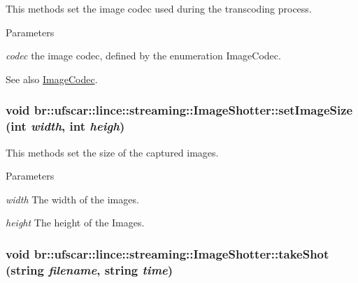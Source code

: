 This methods set the image codec used during the transcoding process. 


\begin{DoxyParams}{Parameters}
\item[{\em codec}]the image codec, defined by the enumeration ImageCodec. \end{DoxyParams}
\begin{DoxySeeAlso}{See also}
\hyperlink{namespacebr_1_1ufscar_1_1lince_1_1streaming_aeaf227c1caf3369cc7c90188dac89494}{ImageCodec}. 
\end{DoxySeeAlso}
\hypertarget{classbr_1_1ufscar_1_1lince_1_1streaming_1_1ImageShotter_a0e98451cd6314d1649499d7f0b607530}{
\subsubsection[{setImageSize}]{\setlength{\rightskip}{0pt plus 5cm}void br::ufscar::lince::streaming::ImageShotter::setImageSize (int {\em width}, \/  int {\em heigh})}}
\label{classbr_1_1ufscar_1_1lince_1_1streaming_1_1ImageShotter_a0e98451cd6314d1649499d7f0b607530}


This methods set the size of the captured images. 


\begin{DoxyParams}{Parameters}
\item[{\em width}]The width of the images. \item[{\em height}]The height of the Images. \end{DoxyParams}
\hypertarget{classbr_1_1ufscar_1_1lince_1_1streaming_1_1ImageShotter_a793acdf0bc839712847085535780a900}{
\subsubsection[{takeShot}]{\setlength{\rightskip}{0pt plus 5cm}void br::ufscar::lince::streaming::ImageShotter::takeShot (string {\em filename}, \/  string {\em time})}}
\label{classbr_1_1ufscar_1_1lince_1_1streaming_1_1ImageShotter_a793acdf0bc839712847085535780a900}


